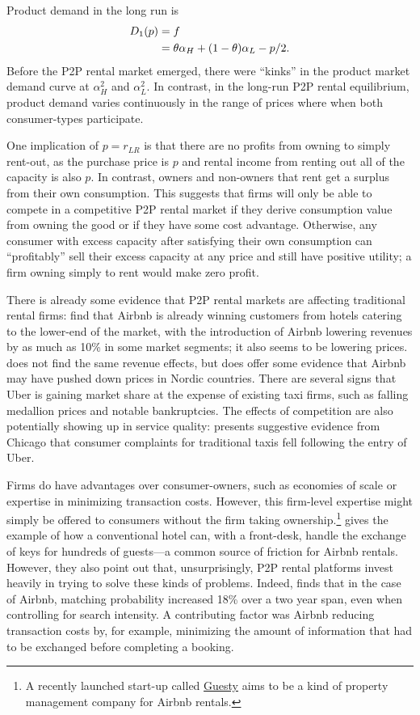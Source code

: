 \documentclass[11pt]{article}
\begin{document}
Product demand in the long run is
\begin{align}
D_1(p) &= f \notag \\  
     &= \theta \alpha_H + (1-\theta) \alpha_L - p/2.  
\end{align} 
Before the P2P rental market emerged, there were ``kinks'' in the product market demand curve at $\alpha_H^2$ and $\alpha_L^2$. 
In contrast, in the long-run P2P rental equilibrium, product demand varies continuously in the range of prices where when both consumer-types participate.

One implication of $p = r_{LR}$ is that there are no profits from owning to simply rent-out, as the purchase price is $p$ and rental income from renting out all of the capacity is also $p$.  
In contrast, owners and non-owners that rent get a surplus from their own consumption. 
This suggests that firms will only be able to compete in a competitive P2P rental market if they derive consumption value from owning the good or if they have some cost advantage.
Otherwise, any consumer with excess capacity after satisfying their own consumption can ``profitably'' sell their excess capacity at any price and still have positive utility; a firm owning simply to rent would make zero profit.

There is already some evidence that P2P rental markets are affecting traditional rental firms: 
\cite{byers2013rise} find that Airbnb is already winning customers from hotels catering to the lower-end of the market, with the introduction of Airbnb lowering revenues by as much as 10\% in some market segments;
it also seems to be lowering prices. 
\cite{neeser2015does} does not find the same revenue effects, but does offer some evidence that Airbnb may have pushed down prices in Nordic countries.
There are several signs that Uber is gaining market share at the expense of existing taxi firms, such as falling medallion prices and notable bankruptcies.
The effects of competition are also potentially showing up in service quality:
\cite{wallsten2015} presents suggestive evidence from Chicago that consumer complaints for traditional taxis fell following the entry of Uber. 

Firms do have advantages over consumer-owners, such as economies of scale or expertise in minimizing transaction costs. 
However, this firm-level expertise might simply be offered to consumers without the firm taking ownership.\footnote{
  A recently launched start-up called \href{https://www.guesty.com/}{Guesty} aims to be a kind of property management company for Airbnb rentals.
}
\cite{edelman2015efficiencies} gives the example of how a conventional hotel can, with a front-desk, handle the exchange of keys for hundreds of guests---a common source of friction for Airbnb rentals.
However, they also point out that, unsurprisingly, P2P rental platforms invest heavily in trying to solve these kinds of problems. 
Indeed, \cite{fradkin2012online} finds that in the case of Airbnb, matching probability increased 18\% over a two year span, even when controlling for search intensity.
A contributing factor was Airbnb reducing transaction costs by, for example, minimizing the amount of information that had to be exchanged before completing a booking. 
\end{document}
